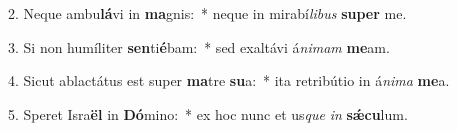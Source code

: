 2. Neque ambu\textbf{lá}vi in \textbf{ma}gnis:~*  neque in mirabí\textit{li}\textit{bus} \textbf{su}\textbf{per} me.\

3. Si non humíliter \textbf{sen}ti\textbf{é}bam:~*  sed exaltávi á\textit{ni}\textit{mam} \textbf{me}am.\

4. Sicut ablactátus est super \textbf{ma}tre \textbf{su}a:~*  ita retribútio in á\textit{ni}\textit{ma} \textbf{me}a.\

5. Speret Isra\textbf{ël} in \textbf{Dó}mino:~*  ex hoc nunc et us\textit{que} \textit{in} \textbf{sǽ}\textbf{cu}lum.\


